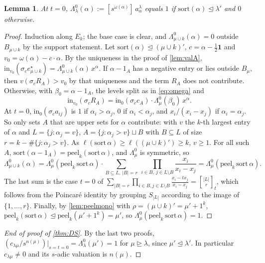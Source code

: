 \documentclass[11pt]{amsart}
\newtheorem{lemma}[theorem]{Lemma}
\theoremstyle{definition}
\theoremstyle{remark}
\numberwithin{equation}{section}
\newcommand{\qbin}[2]{\genfrac{[}{]}{0pt}{}{#1}{#2}_t}
\begin{document}
\begin{lemma}\label{lem:valB}
At $t=0$, $\Lambda^0_\lambda(\alpha):=[s^{\omega(\alpha)}]\,a^\lambda_\alpha$ equals $1$ if $\mathrm{sort}(\alpha)\trianglelefteq\lambda'$ and $0$ otherwise.
\end{lemma}
\begin{proof}
Induction along $E_k$; the base case is clear, and $\Lambda^0_{\mu\cup k}(\alpha)=0$ outside $B_{\mu\cup k}$ by the support statement. Let $\mathrm{sort}(\alpha)\trianglelefteq(\mu\cup k)'$, $c=\alpha-\frac12\mathbf1$ and $v_0=\omega(\alpha)-c\cdot\alpha$. By the uniqueness in the proof of \cref{lem:valA}, $\mathrm{in}_{v_0}(\sigma_ce^\star_{\mu\cup k})=\Lambda^0_{\mu\cup k}(\alpha)\,x^\alpha$. If $\alpha-1_A$ has a negative entry or lies outside $B_\mu$, then $v(\sigma_cR_A)>v_0$ by that uniqueness and the term $R_A$ does not contribute. Otherwise, with $\beta_0=\alpha-1_A$, the levels split as in \eqref{eq:omega} and
\[ \mathrm{in}_{v_0}(\sigma_cR_A)=\mathrm{in}_0(\sigma_cc_A)\cdot\Lambda^0_\mu(\beta_0)\,x^\alpha . \]
At $t=0$, $\mathrm{in}_0(\sigma_ca_{ij})$ is $1$ if $\alpha_i>\alpha_j$, $0$ if $\alpha_i<\alpha_j$, and $x_i/(x_i-x_j)$ if $\alpha_i=\alpha_j$. So only sets $A$ that are upper sets for $\alpha$ contribute: with $v$ the $k$-th largest entry of $\alpha$ and $L=\{j:\alpha_j=v\}$, $A=\{j:\alpha_j>v\}\sqcup B$ with $B\subseteq L$ of size $r=k-\#\{j:\alpha_j>v\}$. As $\ell(\mathrm{sort}\,\alpha)\ge\ell((\mu\cup k)')\ge k$, $v\ge1$. For all such $A$, $\mathrm{sort}(\alpha-1_A)=\mathrm{peel}_k(\mathrm{sort}\,\alpha)$, and $\Lambda^0_\mu$ is symmetric, so
\[ \Lambda^0_{\mu\cup k}(\alpha)=\Lambda^0_\mu(\mathrm{peel}_k\,\mathrm{sort}\,\alpha)\cdot\sum_{B\subseteq L,\ |B|=r}\ \prod_{i\in B,\ j\in L\setminus B}\frac{x_i}{x_i-x_j}=\Lambda^0_\mu(\mathrm{peel}_k\,\mathrm{sort}\,\alpha). \]
The last sum is the case $t=0$ of $\sum_{|B|=r}\prod_{i\in B,j\in L\setminus B}\frac{x_i-tx_j}{x_i-x_j}=\qbin{|L|}{r}$, which follows from the Poincar\'e identity \cite[III (1.4)]{Macdonald95} by grouping $S_{|L|}$ according to the image of $\{1,\dots,r\}$. Finally, by \cref{lem:peelmono} with $\rho=(\mu\cup k)'=\mu'+1^k$, $\mathrm{peel}_k(\mathrm{sort}\,\alpha)\trianglelefteq\mathrm{peel}_k(\mu'+1^k)=\mu'$, so $\Lambda^0_\mu(\mathrm{peel}_k\,\mathrm{sort}\,\alpha)=1$.
\end{proof}

\begin{proof}[End of proof of \cref{thm:DS}]
By the last two proofs, $(c_{\lambda\mu}/s^{n(\mu)})|_{s=t=0}=\Lambda^0_\lambda(\mu')=1$ for $\mu\trianglerighteq\lambda$, since $\mu'\trianglelefteq\lambda'$. In particular $c_{\lambda\mu}\neq0$ and its $s$-adic valuation is $n(\mu)$.
\end{proof}
\end{document}
